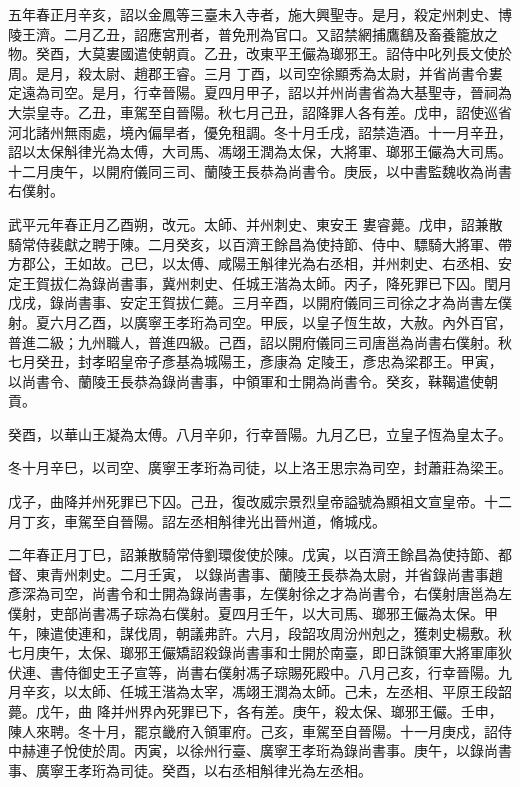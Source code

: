 \begin{pinyinscope}
 五年春正月辛亥，詔以金鳳等三臺未入寺者，施大興聖寺。是月，殺定州刺史、博陵王濟。二月乙丑，詔應宮刑者，普免刑為官口。又詔禁網捕鷹鷂及畜養籠放之物。癸酉，大莫婁國遣使朝貢。乙丑，改東平王儼為瑯邪王。詔侍中叱列長文使於周。是月，殺太尉、趙郡王睿。三月
 丁酉，以司空徐顯秀為太尉，并省尚書令婁定遠為司空。是月，行幸晉陽。夏四月甲子，詔以并州尚書省為大基聖寺，晉祠為大崇皇寺。乙丑，車駕至自晉陽。秋七月己丑，詔降罪人各有差。戊申，詔使巡省河北諸州無雨處，境內偏旱者，優免租調。冬十月壬戌，詔禁造酒。十一月辛丑，詔以太保斛律光為太傅，大司馬、馮翊王潤為太保，大將軍、瑯邪王儼為大司馬。十二月庚午，以開府儀同三司、蘭陵王長恭為尚書令。庚辰，以中書監魏收為尚書右僕射。



 武平元年春正月乙酉朔，改元。太師、并州刺史、東安王
 婁睿薨。戊申，詔兼散騎常侍裴獻之聘于陳。二月癸亥，以百濟王餘昌為使持節、侍中、驃騎大將軍、帶方郡公，王如故。己巳，以太傅、咸陽王斛律光為右丞相，并州刺史、右丞相、安定王賀拔仁為錄尚書事，冀州刺史、任城王湝為太師。丙子，降死罪已下囚。閏月戊戌，錄尚書事、安定王賀拔仁薨。三月辛酉，以開府儀同三司徐之才為尚書左僕射。夏六月乙酉，以廣寧王孝珩為司空。甲辰，以皇子恆生故，大赦。內外百官，普進二級；九州職人，普進四級。己酉，詔以開府儀同三司唐邕為尚書右僕射。秋七月癸丑，封孝昭皇帝子彥基為城陽王，彥康為
 定陵王，彥忠為梁郡王。甲寅，以尚書令、蘭陵王長恭為錄尚書事，中領軍和士開為尚書令。癸亥，靺鞨遣使朝貢。



 癸酉，以華山王凝為太傅。八月辛卯，行幸晉陽。九月乙巳，立皇子恆為皇太子。



 冬十月辛巳，以司空、廣寧王孝珩為司徒，以上洛王思宗為司空，封蕭莊為梁王。



 戊子，曲降并州死罪已下囚。己丑，復改威宗景烈皇帝謚號為顯祖文宣皇帝。十二月丁亥，車駕至自晉陽。詔左丞相斛律光出晉州道，脩城戍。



 二年春正月丁巳，詔兼散騎常侍劉環俊使於陳。戊寅，以百濟王餘昌為使持節、都督、東青州刺史。二月壬寅，
 以錄尚書事、蘭陵王長恭為太尉，并省錄尚書事趙彥深為司空，尚書令和士開為錄尚書事，左僕射徐之才為尚書令，右僕射唐邕為左僕射，吏部尚書馮子琮為右僕射。夏四月壬午，以大司馬、瑯邪王儼為太保。甲午，陳遣使連和，謀伐周，朝議弗許。六月，段韶攻周汾州剋之，獲刺史楊敷。秋七月庚午，太保、瑯邪王儼矯詔殺錄尚書事和士開於南臺，即日誅領軍大將軍庫狄伏連、書侍御史王子宣等，尚書右僕射馮子琮賜死殿中。八月己亥，行幸晉陽。九月辛亥，以太師、任城王湝為太宰，馮翊王潤為太師。己未，左丞相、平原王段韶薨。戊午，曲
 降并州界內死罪已下，各有差。庚午，殺太保、瑯邪王儼。壬申，陳人來聘。冬十月，罷京畿府入領軍府。己亥，車駕至自晉陽。十一月庚戍，詔侍中赫連子悅使於周。丙寅，以徐州行臺、廣寧王孝珩為錄尚書事。庚午，以錄尚書事、廣寧王孝珩為司徒。癸酉，以右丞相斛律光為左丞相。




\end{pinyinscope}
